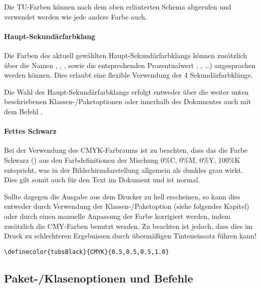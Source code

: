Die TU-Farben können nach dem oben erläuterten Schema abgerufen und verwendet
werden wie jede andere Farbe auch.

\paragraph{Haupt-Sekundärfarbklang}\label{sec:secondary}

Die Farben des aktuell gewählten Haupt-Sekundärfarbklangs können zusätzlich
über die Namen ,
, , sowie die
entsprechenden Prozentualwert ,
, \ldots) angesprochen werden können.
Dies erlaubt eine flexible Verwendung der 4 Sekundärfarbklänge.

Die Wahl der Haupt-Sekundärfarbklangs erfolgt entweder über die weiter
unten beschriebenen Klassen-/Paketoptionen oder innerhalb des Dokumentes auch
mit dem Befehl .

\paragraph{Fettes Schwarz}\label{sec:richblack}

  Bei der Verwendung des CMYK-Farbraums ist zu beachten,
  dass das die Farbe Schwarz ()
  aus den Farbdefinitionen der Mischung 0\%C, 0\%M, 0\%Y, 100\%K entspricht,
  was in der Bildschirmdarstellung allgemein als dunkles grau wirkt. Dies
  gilt somit auch für den Text im Dokument und ist normal.

  Sollte dagegen die Ausgabe aus dem Drucker zu hell erscheinen, so kann dies
  entweder durch Verwendung der Klassen-/Paketoption 
  (siehe folgendes Kapitel) oder durch einen manuelle Anpassung der Farbe
   korrigiert werden,
  indem zusätzlich die CMY-Farben benutzt werden.
  Zu beachten ist jedoch, dass dies im Druck zu schlechteren Ergebnissen
  durch übermäßigen Tinteneinsatz führen kann!
  
  \begin{example}
    \lstinline!\definecolor{tubsBlack}{CMYK}{0.5,0.5,0.5,1.0}!
  \end{example}


\subsection{Paket-/Klasenoptionen und Befehle}

\begin{Declaration}
  \\
  \\
  \\[1ex]
\end{Declaration}

